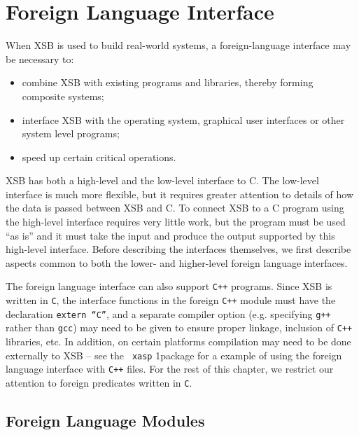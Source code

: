 \chapter{Foreign Language Interface}
\label{foreign}

When XSB is used to build real-world systems, a foreign-language
interface may be necessary to:
\begin{itemize}
\item combine XSB with existing programs and libraries, thereby
      forming composite systems;
\item interface XSB with the operating system, graphical user 
      interfaces or other system level programs;
\item speed up certain critical operations.
\end{itemize}

XSB has both a high-level and the low-level interface to C.  The
low-level interface is much more flexible, but it requires greater
attention to details of how the data is passed between XSB and C.  To
connect XSB to a C program using the high-level interface requires
very little work, but the program must be used ``as is'' and it must
take the input and produce the output supported by this high-level
interface.  Before describing the interfaces themselves, we first
describe aspects common to both the lower- and higher-level foreign
language interfaces.

The foreign language interface can also support {\tt C++} programs.
Since XSB is written in {\tt C}, the interface functions in the
foreign {\tt C++} module must have the declaration {\tt extern ``C''},
and a separate compiler option (e.g. specifying {\tt g++} rather than
{\tt gcc}) may need to be given to ensure proper linkage, inclusion of
{\tt C++} libraries, etc.  In addition, on certain platforms
compilation may need to be done externally to XSB -- see the {\tt
  xasp} 1package for a example of using the foreign language interface
with {\tt C++} files.  For the rest of this chapter, we restrict our
attention to foreign predicates written in {\tt C}.

\section{Foreign Language Modules}

